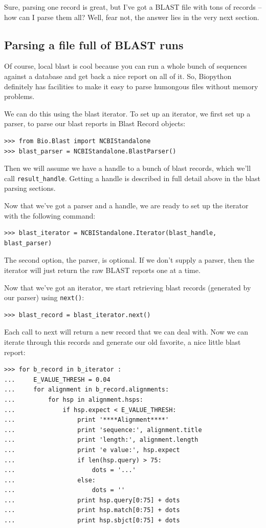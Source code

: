 \documentclass{report}
\begin{document}
Sure, parsing one record is great, but I've got a BLAST file with tons of records -- how can I parse them all? Well, fear not, the answer lies in the very next section.

\subsection{Parsing a file full of BLAST runs}

Of course, local blast is cool because you can run a whole bunch of sequences against a database and get back a nice report on all of it. So, Biopython definitely has facilities to make it easy to parse humongous files without memory problems.

We can do this using the blast iterator. To set up an iterator, we first set up a parser, to parse our blast reports in Blast Record objects:

\begin{verbatim}
>>> from Bio.Blast import NCBIStandalone
>>> blast_parser = NCBIStandalone.BlastParser()
\end{verbatim}

Then we will assume we have a handle to a bunch of blast records, which we'll call \verb|result_handle|. Getting a handle is described in full detail above in the blast parsing sections.

Now that we've got a parser and a handle, we are ready to set up the iterator with the following command:

\begin{verbatim}
>>> blast_iterator = NCBIStandalone.Iterator(blast_handle, blast_parser)
\end{verbatim}

The second option, the parser, is optional. If we don't supply a parser, then the iterator will just return the raw BLAST reports one at a time.

Now that we've got an iterator, we start retrieving blast records (generated by our parser) using \verb|next()|:

\begin{verbatim}
>>> blast_record = blast_iterator.next()
\end{verbatim}

Each call to next will return a new record that we can deal with. Now we can iterate through this records and generate our old favorite, a nice little blast report:

\begin{verbatim}
>>> for b_record in b_iterator :
...     E_VALUE_THRESH = 0.04
...     for alignment in b_record.alignments:
...         for hsp in alignment.hsps:
...             if hsp.expect < E_VALUE_THRESH:
...                 print '****Alignment****'
...                 print 'sequence:', alignment.title
...                 print 'length:', alignment.length
...                 print 'e value:', hsp.expect
...                 if len(hsp.query) > 75:
...                     dots = '...'
...                 else:
...                     dots = ''
...                 print hsp.query[0:75] + dots
...                 print hsp.match[0:75] + dots
...                 print hsp.sbjct[0:75] + dots
\end{verbatim}
\end{document}
